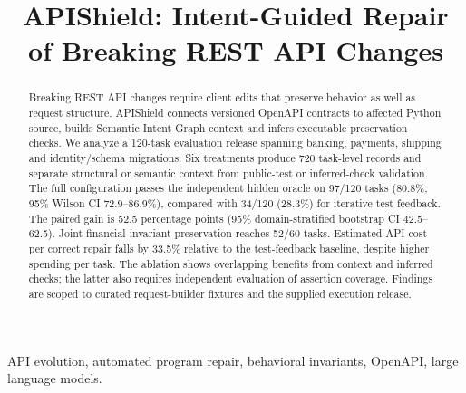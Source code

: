 \documentclass[conference,twocolumn]{IEEEtran}
\begin{document}
\title{APIShield: Intent-Guided Repair of Breaking REST API Changes}
\author{}
\maketitle
\begin{abstract}
Breaking REST API changes require client edits that preserve behavior as well as request structure. APIShield connects versioned OpenAPI contracts to affected Python source, builds Semantic Intent Graph context and infers executable preservation checks. We analyze a 120-task evaluation release spanning banking, payments, shipping and identity/schema migrations. Six treatments produce 720 task-level records and separate structural or semantic context from public-test or inferred-check validation. The full configuration passes the independent hidden oracle on 97/120 tasks (80.8\%; 95\% Wilson CI 72.9--86.9\%), compared with 34/120 (28.3\%) for iterative test feedback. The paired gain is 52.5 percentage points (95\% domain-stratified bootstrap CI 42.5--62.5). Joint financial invariant preservation reaches 52/60 tasks. Estimated API cost per correct repair falls by 33.5\% relative to the test-feedback baseline, despite higher spending per task. The ablation shows overlapping benefits from context and inferred checks; the latter also requires independent evaluation of assertion coverage. Findings are scoped to curated request-builder fixtures and the supplied execution release.
\end{abstract}
\begin{IEEEkeywords}
API evolution, automated program repair, behavioral invariants, OpenAPI, large language models.
\end{IEEEkeywords}



\end{document}
